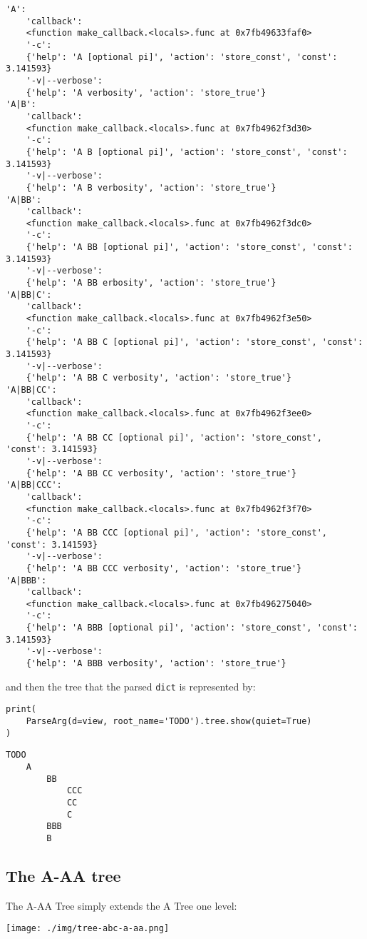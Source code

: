 \documentclass[10pt]{amsart}
\numberwithin{equation}{section}
\begin{document}
\begin{verbatim}
'A':
    'callback':
    <function make_callback.<locals>.func at 0x7fb49633faf0>
    '-c':
    {'help': 'A [optional pi]', 'action': 'store_const', 'const': 3.141593}
    '-v|--verbose':
    {'help': 'A verbosity', 'action': 'store_true'}
'A|B':
    'callback':
    <function make_callback.<locals>.func at 0x7fb4962f3d30>
    '-c':
    {'help': 'A B [optional pi]', 'action': 'store_const', 'const': 3.141593}
    '-v|--verbose':
    {'help': 'A B verbosity', 'action': 'store_true'}
'A|BB':
    'callback':
    <function make_callback.<locals>.func at 0x7fb4962f3dc0>
    '-c':
    {'help': 'A BB [optional pi]', 'action': 'store_const', 'const': 3.141593}
    '-v|--verbose':
    {'help': 'A BB erbosity', 'action': 'store_true'}
'A|BB|C':
    'callback':
    <function make_callback.<locals>.func at 0x7fb4962f3e50>
    '-c':
    {'help': 'A BB C [optional pi]', 'action': 'store_const', 'const': 3.141593}
    '-v|--verbose':
    {'help': 'A BB C verbosity', 'action': 'store_true'}
'A|BB|CC':
    'callback':
    <function make_callback.<locals>.func at 0x7fb4962f3ee0>
    '-c':
    {'help': 'A BB CC [optional pi]', 'action': 'store_const', 'const': 3.141593}
    '-v|--verbose':
    {'help': 'A BB CC verbosity', 'action': 'store_true'}
'A|BB|CCC':
    'callback':
    <function make_callback.<locals>.func at 0x7fb4962f3f70>
    '-c':
    {'help': 'A BB CCC [optional pi]', 'action': 'store_const', 'const': 3.141593}
    '-v|--verbose':
    {'help': 'A BB CCC verbosity', 'action': 'store_true'}
'A|BBB':
    'callback':
    <function make_callback.<locals>.func at 0x7fb496275040>
    '-c':
    {'help': 'A BBB [optional pi]', 'action': 'store_const', 'const': 3.141593}
    '-v|--verbose':
    {'help': 'A BBB verbosity', 'action': 'store_true'}
\end{verbatim}
and then the tree that the parsed \texttt{dict} is represented by:
\begin{verbatim}
print(
    ParseArg(d=view, root_name='TODO').tree.show(quiet=True)
)
\end{verbatim}

\begin{verbatim}
TODO
    A
        BB
            CCC
            CC
            C
        BBB
        B
\end{verbatim}


\newpage
\subsection{The A-AA tree}
\label{sec:orge05f5ee}
The A-AA Tree simply extends the A Tree one level:
\begin{center}
\texttt{[image: ./img/tree-abc-a-aa.png]}
\end{center}
\end{document}
